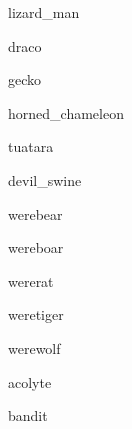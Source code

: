 \documentclass[letterpaper,serif]{module}
\begin{document}
\begin{newmonster}{lizard_man}\end{newmonster}

\begin{newmonster}{draco}\end{newmonster}

\begin{newmonster}{gecko}\end{newmonster}

\begin{newmonster}{horned_chameleon}\end{newmonster}

\begin{newmonster}{tuatara}\end{newmonster}

\begin{newmonster}{devil_swine}\end{newmonster}

\begin{newmonster}{werebear}\end{newmonster}

\begin{newmonster}{wereboar}\end{newmonster}

\begin{newmonster}{wererat}\end{newmonster}

\begin{newmonster}{weretiger}\end{newmonster}

\begin{newmonster}{werewolf}\end{newmonster}


\begin{newmonster}{acolyte}\end{newmonster}

\begin{newmonster}{bandit}\end{newmonster}
\end{document}
